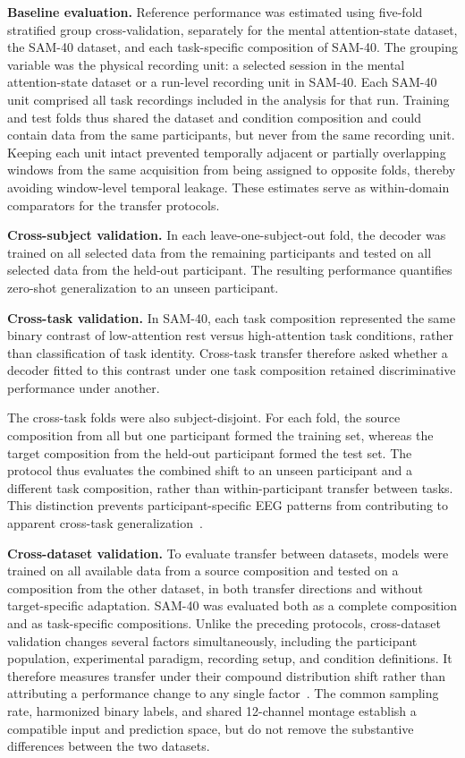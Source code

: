 \documentclass[10pt,letterpaper]{article}
\newcommand{\rev}[1]{#1}
\begin{document}
\textbf{Baseline evaluation.}
\rev{Reference performance was estimated using five-fold stratified group cross-validation, separately for the mental attention-state dataset, the SAM-40 dataset, and each task-specific composition of SAM-40. The grouping variable was the physical recording unit: a selected session in the mental attention-state dataset or a run-level recording unit in SAM-40. Each SAM-40 unit comprised all task recordings included in the analysis for that run. Training and test folds thus shared the dataset and condition composition and could contain data from the same participants, but never from the same recording unit. Keeping each unit intact prevented temporally adjacent or partially overlapping windows from the same acquisition from being assigned to opposite folds, thereby avoiding window-level temporal leakage. These estimates serve as within-domain comparators for the transfer protocols.}

\textbf{Cross-subject validation.}
\rev{In each leave-one-subject-out fold, the decoder was trained on all selected data from the remaining participants and tested on all selected data from the held-out participant. The resulting performance quantifies zero-shot generalization to an unseen participant.}

\textbf{Cross-task validation.}
\rev{In SAM-40, each task composition represented the same binary contrast of low-attention rest versus high-attention task conditions, rather than classification of task identity. Cross-task transfer therefore asked whether a decoder fitted to this contrast under one task composition retained discriminative performance under another.}

\rev{The cross-task folds were also subject-disjoint. For each fold, the source composition from all but one participant formed the training set, whereas the target composition from the held-out participant formed the test set. The protocol thus evaluates the combined shift to an unseen participant and a different task composition, rather than within-participant transfer between tasks. This distinction prevents participant-specific EEG patterns from contributing to apparent cross-task generalization~\cite{kamrud2021vigilance,ke2021crosstask}.}

\textbf{Cross-dataset validation.}
\rev{To evaluate transfer between datasets, models were trained on all available data from a source composition and tested on a composition from the other dataset, in both transfer directions and without target-specific adaptation. SAM-40 was evaluated both as a complete composition and as task-specific compositions. Unlike the preceding protocols, cross-dataset validation changes several factors simultaneously, including the participant population, experimental paradigm, recording setup, and condition definitions. It therefore measures transfer under their compound distribution shift rather than attributing a performance change to any single factor~\cite{lan2019domain}. The common sampling rate, harmonized binary labels, and shared 12-channel montage establish a compatible input and prediction space, but do not remove the substantive differences between the two datasets.}
\end{document}
